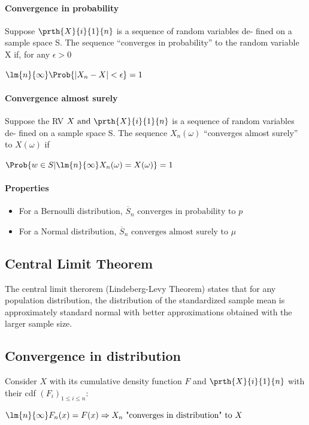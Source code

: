 \paragraph{Convergence in probability}
Suppose $\prth{X}{i}{1}{n}$ is a sequence of random variables de-
fined on a sample space S. The sequence ``converges in probability'' to the
random variable X if, for any $\epsilon>0$
\begin{center}
	$\lm{n}{\infty}\Prob{\left|X_{n}-X\right|<\epsilon}=1$
\end{center}
\paragraph{Convergence almost surely}
Suppose the RV $X\text{ and }\prth{X}{i}{1}{n}$ is a sequence of random variables de-
fined on a sample space S. The sequence $X_{n}(\omega)$ ``converges almost surely'' to $X(\omega)$ if
\begin{center}
	$\Prob{w\in S|\lm{n}{\infty}X_{n}(\omega)=X(\omega)}=1$
\end{center}
\paragraph{Properties}
\begin{itemize}
	\item For a Bernoulli distribution, $\overline{S}_{n}\text{ converges in probability to }p$
	\item For a Normal distribution, $\overline{S}_{n}\text{ converges almost surely to }\mu$
\end{itemize}


\subsection{Central Limit Theorem}
The central limit therorem (Lindeberg-Levy Theorem) states that for any
population distribution, the distribution of the standardized sample mean
is approximately standard normal with better approximations obtained with
the larger sample size.
\begin{center}
\end{center}
\subsection{Convergence in distribution}
Consider $X$ with its cumulative density function $F$ and $\prth{X}{i}{1}{n}$ with their 
cdf $\left( F_{i} \right)_{1\leq i\leq n}$:
\begin{center}
	$\lm{n}{\infty}F_{n}(x)=F(x)\Rightarrow X_{n}\text{ "converges in distribution" to }X$
\end{center}
